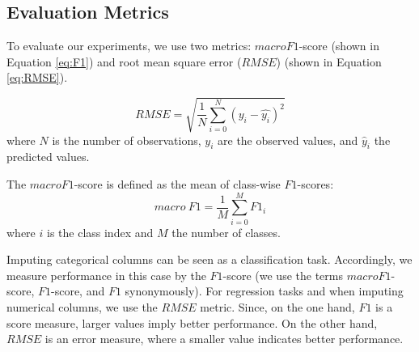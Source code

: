 \subsection{Evaluation Metrics}
%
To evaluate our experiments, we use two metrics: $macro F1$-score (shown in Equation \ref{eq:F1}) and root mean square error ($RMSE$) (shown in Equation \ref{eq:RMSE}).

\begin{equation}
	RMSE = \sqrt{\frac{1}{N} \sum_{i = 0}^{N} (y_i - \hat{y_i})^2}
	\label{eq:RMSE}
\end{equation}
%
where $N$ is the number of observations, $y_i$ are the observed values, and $\hat{y}_{i}$ the predicted values.

The $macroF1$-score is defined as the mean of class-wise $F1$-scores:
%
\begin{equation}
	macro\ F1 = \frac{1}{M}\sum_{i = 0}^{M} F1_i
	\label{eq:F1}
\end{equation}
%
where $i$ is the class index and $M$ the number of classes.

Imputing categorical columns can be seen as a classification task. Accordingly, we measure performance in this case by the $F1$-score (we use the terms $macro F1$-score, $F1$-score, and $F1$ synonymously). For regression tasks and when imputing numerical columns, we use the $RMSE$ metric. Since, on the one hand, $F1$ is a score measure, larger values imply better performance. On the other hand, $RMSE$ is an error measure, where a smaller value indicates better performance.
